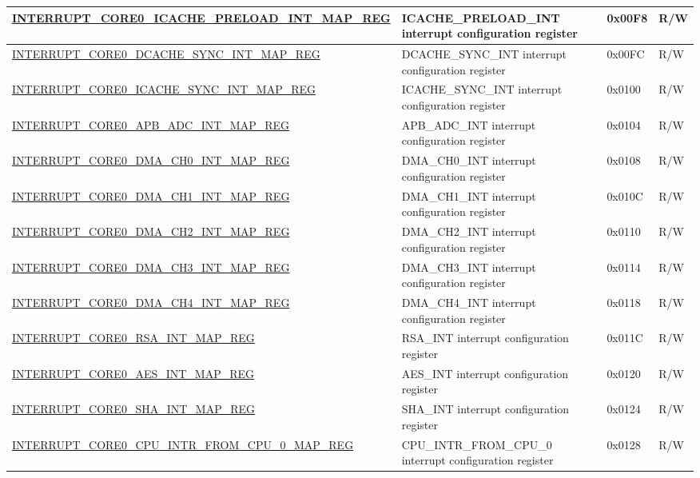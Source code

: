 \begin{landscape}
\begin{longtable}{ | p{10cm} | p{10.2cm} | p{1.3cm} | p{1cm} | }
\hyperref[regdesc:INTERRUPTCORE0ICACHEPRELOADINTMAPREG]{INTERRUPT\_CORE0\_ICACHE\_PRELOAD\_INT\_MAP\_REG} & ICACHE\_PRELOAD\_INT interrupt configuration register & 0x00F8 & R/W \\ \hline
\hyperref[regdesc:INTERRUPTCORE0DCACHESYNCINTMAPREG]{INTERRUPT\_CORE0\_DCACHE\_SYNC\_INT\_MAP\_REG} & DCACHE\_SYNC\_INT interrupt configuration register & 0x00FC & R/W \\ \hline
\hyperref[regdesc:INTERRUPTCORE0ICACHESYNCINTMAPREG]{INTERRUPT\_CORE0\_ICACHE\_SYNC\_INT\_MAP\_REG} & ICACHE\_SYNC\_INT interrupt configuration register & 0x0100 & R/W \\ \hline
\hyperref[regdesc:INTERRUPTCORE0APBADCINTMAPREG]{INTERRUPT\_CORE0\_APB\_ADC\_INT\_MAP\_REG} & APB\_ADC\_INT interrupt configuration register & 0x0104 & R/W \\ \hline
\hyperref[regdesc:INTERRUPTCORE0DMACH0INTMAPREG]{INTERRUPT\_CORE0\_DMA\_CH0\_INT\_MAP\_REG} & DMA\_CH0\_INT interrupt configuration register & 0x0108 & R/W \\ \hline
\hyperref[regdesc:INTERRUPTCORE0DMACH1INTMAPREG]{INTERRUPT\_CORE0\_DMA\_CH1\_INT\_MAP\_REG} & DMA\_CH1\_INT interrupt configuration register & 0x010C & R/W \\ \hline
\hyperref[regdesc:INTERRUPTCORE0DMACH2INTMAPREG]{INTERRUPT\_CORE0\_DMA\_CH2\_INT\_MAP\_REG} & DMA\_CH2\_INT interrupt configuration register & 0x0110 & R/W \\ \hline
\hyperref[regdesc:INTERRUPTCORE0DMACH3INTMAPREG]{INTERRUPT\_CORE0\_DMA\_CH3\_INT\_MAP\_REG} & DMA\_CH3\_INT interrupt configuration register & 0x0114 & R/W \\ \hline
\hyperref[regdesc:INTERRUPTCORE0DMACH4INTMAPREG]{INTERRUPT\_CORE0\_DMA\_CH4\_INT\_MAP\_REG} & DMA\_CH4\_INT interrupt configuration register & 0x0118 & R/W \\ \hline
\hyperref[regdesc:INTERRUPTCORE0RSAINTMAPREG]{INTERRUPT\_CORE0\_RSA\_INT\_MAP\_REG} & RSA\_INT interrupt configuration register & 0x011C & R/W \\ \hline
\hyperref[regdesc:INTERRUPTCORE0AESINTMAPREG]{INTERRUPT\_CORE0\_AES\_INT\_MAP\_REG} & AES\_INT interrupt configuration register & 0x0120 & R/W \\ \hline
\hyperref[regdesc:INTERRUPTCORE0SHAINTMAPREG]{INTERRUPT\_CORE0\_SHA\_INT\_MAP\_REG} & SHA\_INT interrupt configuration register & 0x0124 & R/W \\ \hline
\hyperref[regdesc:INTERRUPTCORE0CPUINTRFROMCPU0MAPREG]{INTERRUPT\_CORE0\_CPU\_INTR\_FROM\_CPU\_0\_MAP\_REG} & CPU\_INTR\_FROM\_CPU\_0 interrupt configuration register & 0x0128 & R/W \\ \hline

\end{longtable}
\end{landscape}
